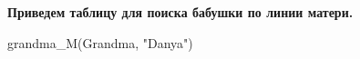 \documentclass[12pt, a4paper]{extarticle}
\begin{document}
\begin{figure}[h!]
	\begin{minipage}[h]{0.48\linewidth}
	\end{minipage}
	\hfill
	\begin{minipage}[h]{0.48\linewidth}
	\end{minipage}
\end{figure}\par

\begin{figure}[h!]	
\end{figure}\par

\newpage
\textbf{Приведем таблицу для поиска бабушки по линии матери. }\par
grandma\_M(Grandma, "Danya")\par
\end{document}
